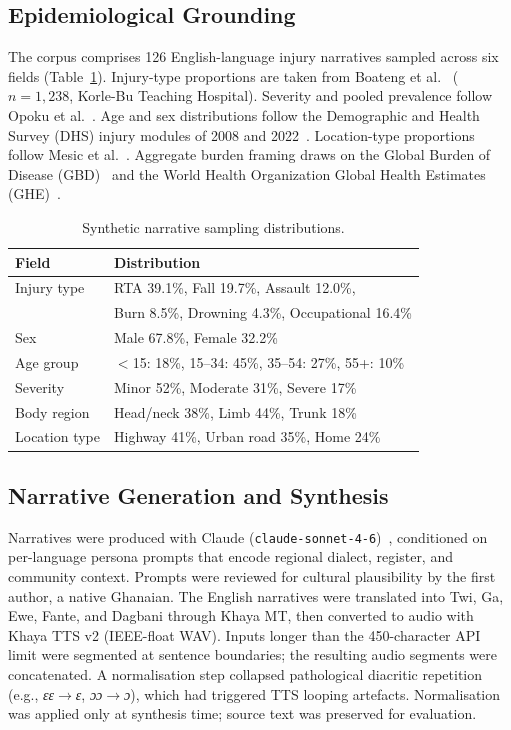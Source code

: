 \documentclass[conference]{IEEEtran}
\begin{document}
\subsection{Epidemiological Grounding}
The corpus comprises 126 English-language injury narratives sampled
across six fields (Table~\ref{tab:distributions}). Injury-type
proportions are taken from Boateng et al.~\cite{boateng2019}
($n = 1{,}238$, Korle-Bu Teaching Hospital). Severity and pooled
prevalence follow Opoku et al.~\cite{opoku2025}. Age and sex
distributions follow the Demographic and Health Survey (DHS) injury
modules of 2008 and 2022~\cite{dhs2008,dhs2022}. Location-type
proportions follow Mesic et al.~\cite{mesic2024}. Aggregate burden
framing draws on the Global Burden of Disease (GBD)~\cite{ihme_gbd}
and the World Health Organization Global Health Estimates
(GHE)~\cite{who_ghe}.

\begin{table}[!t]
\caption{Synthetic narrative sampling distributions.}
\label{tab:distributions}
\centering
\begin{tabular}{ll}
\toprule
\textbf{Field} & \textbf{Distribution} \\
\midrule
Injury type   & RTA 39.1\%, Fall 19.7\%, Assault 12.0\%, \\
              & Burn 8.5\%, Drowning 4.3\%, Occupational 16.4\% \\
Sex           & Male 67.8\%, Female 32.2\% \\
Age group     & $<$15: 18\%, 15--34: 45\%, 35--54: 27\%, 55+: 10\% \\
Severity      & Minor 52\%, Moderate 31\%, Severe 17\% \\
Body region   & Head/neck 38\%, Limb 44\%, Trunk 18\% \\
Location type & Highway 41\%, Urban road 35\%, Home 24\% \\
\bottomrule
\end{tabular}
\end{table}

\subsection{Narrative Generation and Synthesis}
Narratives were produced with Claude
(\texttt{claude-sonnet-4-6})~\cite{anthropic2024}, conditioned on
per-language persona prompts that encode regional dialect, register,
and community context. Prompts were reviewed for cultural
plausibility by the first author, a native Ghanaian. The English
narratives were translated into Twi, Ga, Ewe, Fante, and Dagbani
through Khaya MT, then converted to audio with Khaya TTS v2
(IEEE-float WAV). Inputs longer than the 450-character API limit
were segmented at sentence boundaries; the resulting audio segments
were concatenated. A normalisation step collapsed pathological
diacritic repetition (e.g., \textit{ɛɛ}$\rightarrow$\textit{ɛ},
\textit{ɔɔ}$\rightarrow$\textit{ɔ}), which had triggered TTS looping
artefacts. Normalisation was applied only at synthesis time; source
text was preserved for evaluation.
\end{document}
